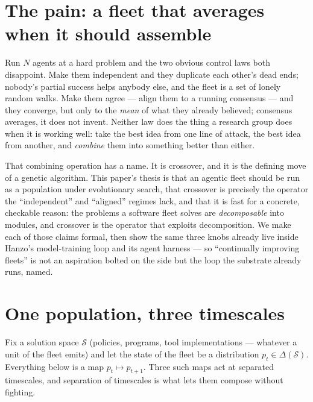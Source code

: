 \documentclass[11pt]{article}
\begin{document}
\section{The pain: a fleet that averages when it should assemble}
\label{sec:pain}

Run $N$ agents at a hard problem and the two obvious control laws both disappoint. Make them independent and
they duplicate each other's dead ends; nobody's partial success helps anybody else, and the fleet is a set of
lonely random walks. Make them agree --- align them to a running consensus --- and they converge, but only to
the \emph{mean} of what they already believed; consensus averages, it does not invent. Neither law does the
thing a research group does when it is working well: take the best idea from one line of attack, the best idea
from another, and \emph{combine} them into something better than either.

That combining operation has a name. It is crossover, and it is the defining move of a genetic algorithm.
This paper's thesis is that an agentic fleet should be run as a population under evolutionary search, that
crossover is precisely the operator the ``independent'' and ``aligned'' regimes lack, and that it is fast for
a concrete, checkable reason: the problems a software fleet solves are \emph{decomposable} into modules, and
crossover is the operator that exploits decomposition. We make each of those claims formal, then show the
same three knobs already live inside Hanzo's model-training loop and its agent harness --- so ``continually
improving fleets'' is not an aspiration bolted on the side but the loop the substrate already runs, named.

\section{One population, three timescales}
\label{sec:frame}

Fix a solution space $\mathcal{S}$ (policies, programs, tool implementations --- whatever a unit of the fleet
emits) and let the state of the fleet be a distribution $p_t \in \Delta(\mathcal{S})$. Everything below is a
map $p_t \mapsto p_{t+1}$. Three such maps act at separated timescales, and separation of timescales is what
lets them compose without fighting.
\end{document}
